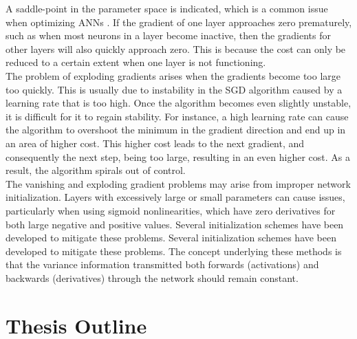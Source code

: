 \noindent A saddle-point in the parameter space is indicated, which is a common issue when optimizing ANNs \cite{dauphin2014identifying}. If the gradient of one layer approaches zero prematurely, such as when most neurons in a layer become inactive, then the gradients for other layers will also quickly approach zero. This is because the cost can only be reduced to a certain extent when one layer is not functioning. \\

\noindent The problem of exploding gradients arises when the gradients become too large too quickly. This is usually due to instability in the SGD algorithm caused by a learning rate that is too high. Once the algorithm becomes even slightly unstable, it is difficult for it to regain stability. For instance, a high learning rate can cause the algorithm to overshoot the minimum in the gradient direction and end up in an area of higher cost. This higher cost leads to the next gradient, and consequently the next step, being too large, resulting in an even higher cost. As a result, the algorithm spirals out of control. \\

\noindent The vanishing and exploding gradient problems may arise from improper network initialization. Layers with excessively large or small parameters can cause issues, particularly when using sigmoid nonlinearities, which have zero derivatives for both large negative and positive values. Several initialization schemes have been developed to mitigate these problems. Several initialization schemes have been developed to mitigate these problems. The concept underlying these methods is that the variance information transmitted both forwards (activations) and backwards (derivatives) through the network should remain constant. 


\section[Thesis Outline]{Thesis Outline}

